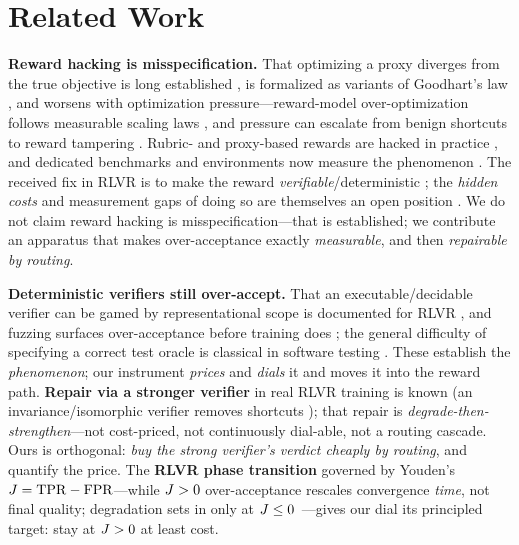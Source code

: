 \section{Related Work}
\textbf{Reward hacking is misspecification.} That optimizing a proxy diverges from the true objective is long
established \citep{amodei2016concrete,krakovna2020specification,skalse2022reward,pan2022misspecification}, is
formalized as variants of Goodhart's law \citep{manheim2018goodhart,karwowski2024goodhart}, and worsens with
optimization pressure---reward-model over-optimization follows measurable scaling laws
\citep{gao2023overoptimization}, and pressure can escalate from benign shortcuts to reward tampering
\citep{denison2024subterfuge}. Rubric- and proxy-based rewards are hacked in practice
\citep{rubricrewardhacking,correlatedproxies}, and dedicated benchmarks and environments now measure the
phenomenon \citep{rewardhackbench,hackverifiable}. The received fix in RLVR is to make the reward
\emph{verifiable}/deterministic \citep{verificationhorizon,lambert2024tulu3}; the \emph{hidden costs} and
measurement gaps of doing so are themselves an open position \citep{hiddencosts}. We do not claim reward
hacking is misspecification---that is established; we contribute an apparatus that makes over-acceptance
exactly \emph{measurable}, and then \emph{repairable by routing}.

\textbf{Deterministic verifiers still over-accept.} That an executable/decidable verifier can be gamed by
representational scope is documented for RLVR \citep{gamingverifiers}, and fuzzing surfaces over-acceptance
before training does \citep{fuzzverifiers}; the general difficulty of specifying a correct test oracle is
classical in software testing \citep{barr2015oracle}. These establish the \emph{phenomenon}; our instrument
\emph{prices} and \emph{dials} it and moves it into the reward path. \textbf{Repair via a stronger verifier}
in real RLVR training is known (an invariance/isomorphic verifier removes shortcuts \citep{gamingverifiers});
that repair is \emph{degrade-then-strengthen}---not cost-priced, not continuously dial-able, not a routing
cascade. Ours is orthogonal: \emph{buy the strong verifier's verdict cheaply by routing}, and quantify the
price. The \textbf{RLVR phase transition} governed by Youden's $J=\mathrm{TPR}-\mathrm{FPR}$---while $J>0$
over-acceptance rescales convergence \emph{time}, not final quality; degradation sets in only at
$J\le0$~\citep{rateorfate2026}---gives our dial its principled target: stay at $J>0$ at least cost.

